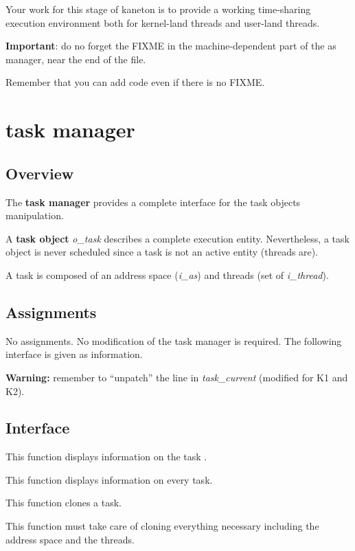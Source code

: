 Your work for this stage of kaneton is to provide a working
time-sharing execution environment both for kernel-land threads and
user-land threads.

\textbf{Important}: do no forget the FIXME in the machine-dependent
part of the as manager, near the end of the file.

Remember that you can add code even if there is no FIXME.


%
%

\newpage

\section{\textbf{task} manager}

\subsection*{Overview}

The \textbf{task manager} provides a complete interface for the
task objects manipulation.

A \textbf{task object} \textit{o\_task} describes a complete
execution entity. Nevertheless, a task object is never scheduled
since a task is not an active entity (threads are).

A task is composed of an address space (\textit{i\_as}) and threads
(set of \textit{i\_thread}).

\subsection*{Assignments}

No assignments. No modification of the task manager is
required. The following interface is given as information.

\textbf{Warning:} remember to ``unpatch'' the line in
\emph{task\_current} (modified for K1 and K2).

\subsection{Interface}

{
  This function displays information on the task .
}

{
  This function displays information on every task.
}

{
  This function clones a task.

  This function must take care of cloning everything necessary
  including the address space and the threads.
}


